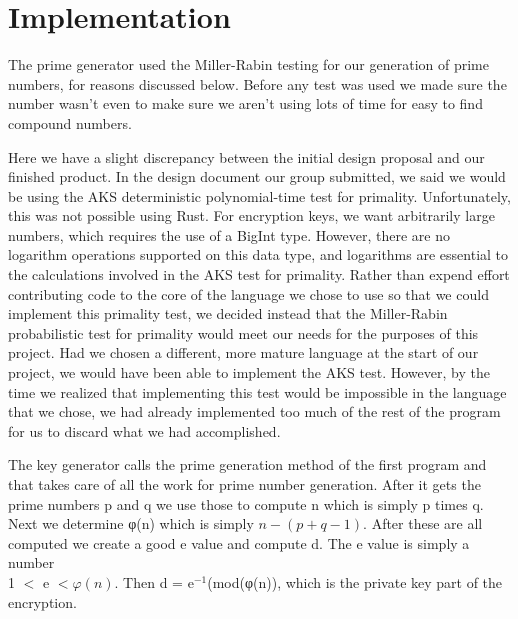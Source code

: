 \documentclass[11pt,technote]{IEEEtran}
\begin{document}
\section{Implementation}
The prime generator used the Miller-Rabin testing for our generation of prime
numbers, for reasons discussed below. Before any test was used we made sure the
number wasn't even to make sure we aren't using lots of time for easy to find 
compound numbers.
\par Here we have a slight discrepancy between the initial design proposal and
our finished product. In the design document our group submitted, we said we
would be using the AKS deterministic polynomial-time test for primality.
Unfortunately, this was not possible using Rust. For encryption keys, we want
arbitrarily large numbers, which requires the use of a BigInt type.
However, there are no logarithm operations supported on this data type,
and logarithms are essential to the calculations involved in the AKS test for
primality. Rather than expend effort contributing code to the core of the
language we chose to use so that we could implement this primality test, we
decided instead that the Miller-Rabin probabilistic test for primality would
meet our needs for the purposes of this project. Had we chosen a different, more
mature language at the start of our project, we would have been able to
implement the AKS test. However, by the time we realized that implementing this
test would be impossible in the language that we chose, we had already
implemented too much of the rest of the program for us to discard what we had
accomplished.
\par The key generator calls the prime generation method of the first program 
and that takes care of all the work for prime number generation. After it gets 
the prime numbers p and q we use those to compute n which is simply p times q. 
Next we determine φ(n) which is simply $n - (p + q -1)$. After these are all 
computed we create a good e value and compute d. The e value is simply a number 
\\1 $<$ e $<φ(n)$. Then d = e$^{-1}$(mod(φ(n)), which is the private key part of 
the encryption.
\end{document}
